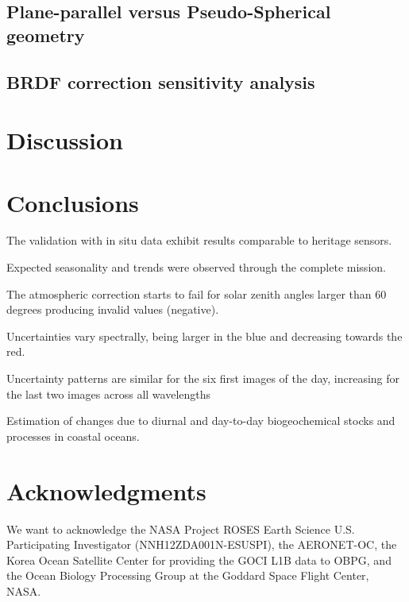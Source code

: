 \documentclass[onecolumn,3p,letterpaper,11pt]{elsarticle}
\begin{document}
\subsection{Plane-parallel versus Pseudo-Spherical geometry}

\subsection{BRDF correction sensitivity analysis}
\section{Discussion}

\section{Conclusions}

The validation with in situ data exhibit results comparable to heritage sensors.

Expected seasonality and trends were observed through the complete mission.

The atmospheric correction starts to fail for solar zenith angles larger than 60 degrees producing invalid values (negative). 

Uncertainties vary spectrally, being larger in the blue and decreasing towards the red.

Uncertainty patterns are similar for the six first images of the day, increasing for the last two images across all wavelengths

Estimation of changes due to diurnal and day-to-day biogeochemical stocks and processes in coastal oceans.


\section*{Acknowledgments}
\vspace{-.2cm}
We want to acknowledge the NASA Project ROSES Earth Science U.S. Participating Investigator (NNH12ZDA001N-ESUSPI), the AERONET-OC, the Korea Ocean Satellite Center for providing the GOCI L1B data to OBPG, and the Ocean Biology Processing Group at the Goddard Space Flight Center, NASA. 
\end{document}
